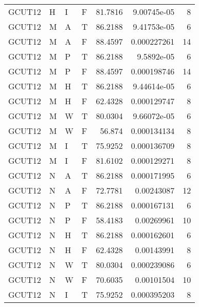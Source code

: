 \begin{longtable}{llllrrr}
    GCUT12   & H         & I         & F          & 81.7816    & 9.00745e-05 & 8        \\
    GCUT12   & M         & A         & T          & 86.2188    & 9.41753e-05 & 6        \\
    GCUT12   & M         & A         & F          & 88.4597    & 0.000227261 & 14       \\
    GCUT12   & M         & P         & T          & 86.2188    & 9.5892e-05  & 6        \\
    GCUT12   & M         & P         & F          & 88.4597    & 0.000198746 & 14       \\
    GCUT12   & M         & H         & T          & 86.2188    & 9.44614e-05 & 6        \\
    GCUT12   & M         & H         & F          & 62.4328    & 0.000129747 & 8        \\
    GCUT12   & M         & W         & T          & 80.0304    & 9.66072e-05 & 6        \\
    GCUT12   & M         & W         & F          & 56.874     & 0.000134134 & 8        \\
    GCUT12   & M         & I         & T          & 75.9252    & 0.000136709 & 8        \\
    GCUT12   & M         & I         & F          & 81.6102    & 0.000129271 & 8        \\
    GCUT12   & N         & A         & T          & 86.2188    & 0.000171995 & 6        \\
    GCUT12   & N         & A         & F          & 72.7781    & 0.00243087  & 12       \\
    GCUT12   & N         & P         & T          & 86.2188    & 0.000167131 & 6        \\
    GCUT12   & N         & P         & F          & 58.4183    & 0.00269961  & 10       \\
    GCUT12   & N         & H         & T          & 86.2188    & 0.000162601 & 6        \\
    GCUT12   & N         & H         & F          & 62.4328    & 0.00143991  & 8        \\
    GCUT12   & N         & W         & T          & 80.0304    & 0.000239086 & 6        \\
    GCUT12   & N         & W         & F          & 70.6035    & 0.00101504  & 10       \\
    GCUT12   & N         & I         & T          & 75.9252    & 0.000395203 & 8        \\

\end{longtable}
